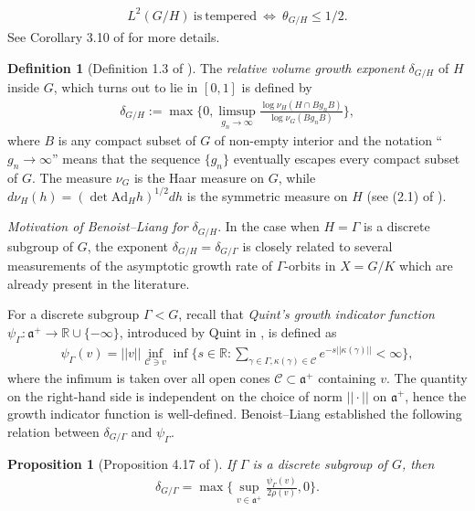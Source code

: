 \documentclass[psamsfonts]{amsart}
\newtheorem{prop}[thm]{Proposition}
\theoremstyle{definition}
\newtheorem{defn}[thm]{Definition}
\theoremstyle{remark}
\numberwithin{equation}{section}
\begin{document}
\begin{align}
\label{equiv2}
L^2(G/H) \ \mathrm{is \ tempered} \ \Longleftrightarrow \ \theta_{G/H} \leq 1/2.
\end{align} See Corollary 3.10 of \cite{BL} for more details.
\begin{defn} [Definition 1.3 of \cite{BL}]
The \emph{relative volume growth exponent} $\delta_{G/H}$ of $H$ inside $G$, which turns out to lie in $[0,1]$ is defined by
\begin{align*}
\delta_{G/H} := \max \bigg \{0, \limsup_{g_{n} \rightarrow \infty} \frac{\log \nu_{H}(H \cap Bg_{n}B)}{\log \nu_{G}(Bg_{n}B)} \bigg \},
\end{align*} where $B$ is any compact subset of $G$ of non-empty interior and the notation ``$g_{n} \to \infty$'' means that the sequence $\{g_{n}\}$ eventually escapes every compact subset of $G$. The measure $\nu_{G}$ is the Haar measure on $G$, while $d\nu_{H}(h) = (\det \mathrm{Ad}_{H}h)^{1/2} dh$ is the symmetric measure on $H$ (see (2.1) of \cite{BL}).
\end{defn}
\emph{Motivation of Benoist--Liang for} $\delta_{G/H}$. In the case when $H = \Gamma$ is a discrete subgroup of $G$, the exponent $\delta_{G/H} = \delta_{G/\Gamma}$ is closely related to several measurements of the asymptotic growth rate of $\Gamma$-orbits in $X = G/K$ which are already present in the literature.
\par 
For a discrete subgroup $\Gamma < G$, recall that \emph{Quint's growth indicator function} $\psi_{\Gamma} : \mathfrak{a}^{+} \rightarrow \mathbb{R} \cup \{-\infty\}$, introduced by Quint in \cite{Q1}, is defined as
\begin{align*}
\psi_{\Gamma}(v) = ||v|| \inf_{\mathcal{C} \ni v} \inf \bigg \{ s \in \mathbb{R} : \sum_{\gamma \in \Gamma, \kappa(\gamma) \in \mathcal{C}} e^{-s ||\kappa(\gamma)||} < \infty \bigg \},
\end{align*} where the infimum is taken over all open cones $\mathcal{C} \subset \mathfrak{a}^{+}$  containing $v$. The quantity on the right-hand side is independent on the choice of norm $||\cdot||$ on $\mathfrak{a}^{+}$, hence the growth indicator function is well-defined. Benoist--Liang established the following relation between $\delta_{G/\Gamma}$ and $\psi_{\Gamma}$.
\begin{prop} [Proposition 4.17 of \cite{BL}]
\label{relationwithgrowthind}
If $\Gamma$ is a discrete subgroup of $G$, then 
\begin{align*}
\delta_{G/\Gamma} = \max \bigg \{ \sup_{v \in \mathfrak{a}^{+}} \frac{\psi_{\Gamma}(v)}{2 \rho(v)}, 0 \bigg \}.
\end{align*} 
\end{prop}
\end{document}
